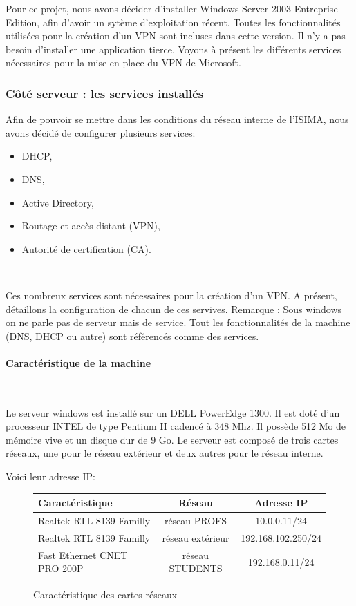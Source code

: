	Pour ce projet, nous avons décider d'installer Windows Server 2003 Entreprise Edition, afin d'avoir un sytème d'exploitation récent. Toutes les fonctionnalités utilisées pour la création d'un VPN sont incluses dans cette version. Il n'y a pas besoin d'installer une application tierce.
	Voyons à présent les différents services nécessaires pour la mise en place du VPN de Microsoft.

\subsubsection{Côté serveur : les services installés}

	Afin de pouvoir se mettre dans les conditions du réseau interne de l'ISIMA, nous avons décidé de configurer plusieurs services:
~


\begin{itemize}
	\item  DHCP,
	\item  DNS, 
	\item  Active Directory,
	\item  Routage et accès distant (VPN),
	\item  Autorité de certification (CA).
\end{itemize}
~	

	Ces nombreux services sont nécessaires pour la création d'un VPN. A présent, détaillons la configuration de chacun de ces servives. 
	Remarque : Sous windows on ne parle pas de serveur mais de service. Tout les fonctionnalités de la machine (DNS, DHCP ou autre) sont référencés comme des services.


\paragraph{Caractéristique de la machine}
~\

Le serveur windows est installé sur un DELL PowerEdge 1300. Il est doté d'un processeur INTEL de type Pentium II cadencé à 348 Mhz. Il possède 512 Mo de mémoire vive et un disque dur de 9 Go.
Le serveur est composé de trois cartes réseaux, une pour le réseau extérieur et deux autres pour le réseau interne. 



Voici leur adresse IP:

\begin{figure}[H]
	\begin{center}
\begin{tabular}{|l|c|c|}
\hline
Caractéristique & Réseau & Adresse IP \\
\hline
Realtek RTL 8139 Familly & réseau PROFS & 10.0.0.11/24 \\
Realtek RTL 8139 Familly & réseau extérieur & 192.168.102.250/24 \\
Fast Ethernet CNET PRO 200P & réseau STUDENTS & 192.168.0.11/24 \\
\hline
\end{tabular}
	\end{center}
	\caption{Caractéristique des cartes réseaux}
	\label{IP_carte_reseau}
\end{figure}

